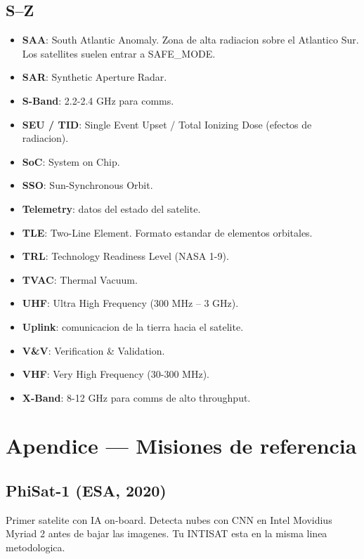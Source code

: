 \documentclass[11pt,a4paper,oneside,openright]{book}
\begin{document}
\section*{S--Z}

\begin{itemize}[leftmargin=2em]
  \item \textbf{SAA}: South Atlantic Anomaly. Zona de alta radiacion sobre
        el Atlantico Sur. Los satellites suelen entrar a SAFE\_MODE.
  \item \textbf{SAR}: Synthetic Aperture Radar.
  \item \textbf{S-Band}: 2.2-2.4 GHz para comms.
  \item \textbf{SEU / TID}: Single Event Upset / Total Ionizing Dose
        (efectos de radiacion).
  \item \textbf{SoC}: System on Chip.
  \item \textbf{SSO}: Sun-Synchronous Orbit.
  \item \textbf{Telemetry}: datos del estado del satelite.
  \item \textbf{TLE}: Two-Line Element. Formato estandar de elementos
        orbitales.
  \item \textbf{TRL}: Technology Readiness Level (NASA 1-9).
  \item \textbf{TVAC}: Thermal Vacuum.
  \item \textbf{UHF}: Ultra High Frequency (300 MHz -- 3 GHz).
  \item \textbf{Uplink}: comunicacion de la tierra hacia el satelite.
  \item \textbf{V\&V}: Verification \& Validation.
  \item \textbf{VHF}: Very High Frequency (30-300 MHz).
  \item \textbf{X-Band}: 8-12 GHz para comms de alto throughput.
\end{itemize}

\appendix
\chapter{Apendice --- Misiones de referencia}

\section{PhiSat-1 (ESA, 2020)}

Primer satelite con IA on-board. Detecta nubes con CNN en Intel Movidius
Myriad 2 antes de bajar las imagenes. Tu INTISAT esta en la misma linea
metodologica.
\end{document}
